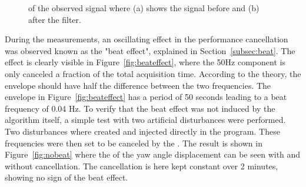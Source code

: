 \begin{figure}[h!]
  \centering %
  \qquad
  \caption{\label{fig:bandpass_imp} \abbrFFT of the observed signal where (a) shows the signal before and (b) after the filter.}
\end{figure}
\FloatBarrier
During the measurements, an oscillating effect in the performance cancellation was observed known as the "beat effect", explained in Section~\ref{subsec:beat}. The effect is clearly visible in Figure~\ref{fig:beateffect}, where the 50Hz component is only canceled a fraction of the total acquisition time. According to the theory, the envelope should have half the difference between the two frequencies. The envelope in Figure~\ref{fig:beateffect} has a period of 50 seconds leading to a beat frequency of 0.04 Hz. To verify that the beat effect was not induced by the algorithm itself, a simple test with two artificial disturbances were performed. Two disturbances where created and injected directly in the program. These frequencies were then set to be canceled by the \abbrRFDC. The result is shown in Figure~\ref{fig:nobeat} where the \abbrSTD of the yaw angle displacement can be seen with and without cancellation. The cancellation is here kept constant over 2 minutes, showing no sign of the beat effect.

